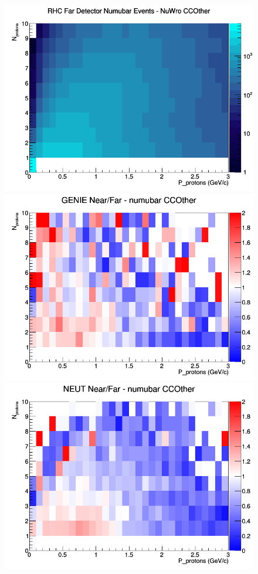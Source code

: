 \begin{figure}[h]
\endminipage
{}
\includegraphics[width=\linewidth]{N_P/nominal/protons/CCOther_RHC_FD_numubar_N_P_NuWro.png}
\endminipage
\newline
{}
\includegraphics[width=\linewidth]{N_P/nominal/protons/ratios/CCOther_GENIE_numubar_NF_N_P.png}
\endminipage
{}
\includegraphics[width=\linewidth]{N_P/nominal/protons/ratios/CCOther_NEUT_numubar_NF_N_P.png}

\end{figure}
